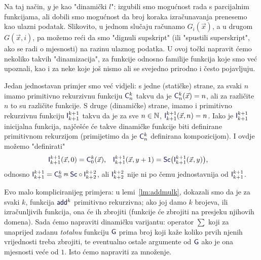 Na taj način, $y$ je kao "dinamički $l$": izgubili smo mogućnost rada s parcijalnim funkcijama, ali dobili smo mogućnost da broj koraka izračunavanja prenesemo kao ulazni podatak. Slikovito, u jednom slučaju računamo $G_i(\vec x)$, a u drugom $G(\vec x,i)$, pa možemo reći da smo "dignuli supskript" (ili "spustili superskript", ako se radi o mjesnosti) na razinu ulaznog podatka. U ovoj točki napravit ćemo nekoliko takvih "dinamizacija", za funkcije odnosno familije funkcija koje smo već upoznali, kao i za neke koje još nismo ali se svejedno prirodno i često pojavljuju.

\begin{primjer}[{name=[koordinantna projekcija kao dinamizacija konstantnih funkcija]}]
Jedan jednostavan primjer smo već vidjeli: s jedne (statičke) strane, za svaki $n$ imamo primitivno rekurzivnu funkciju $\f C_n^k$ takvu da je $\f C_n^k(\vec x)=n$, ali za različite $n$ to su različite funkcije. S druge (dinamičke) strane, imamo i primitivno rekurzivnu funkciju $\f I_{k+1}^{k+1}$ takvu da je za sve $n\in{\mathbb N}$, $\f I_{k+1}^{k+1}(\vec x,n)=n$. Iako je $\f I_{k+1}^{k+1}$ inicijalna funkcija, najčešće će takve dinamičke funkcije biti definirane primitivnom rekurzijom (primijetimo da je $\f C_n^k$ definirana kompozicijom). I ovdje možemo "definirati"
\begin{align}
    \f I_{k+1}^{k+1}(\vec x,0)&=\f C_0^k(\vec x)\text,&
    \f I_{k+1}^{k+1}(\vec x,y+1)&=\f{Sc}\bigl(\f I_{k+1}^{k+1}(\vec x,y)\bigr)\text,
\end{align}
odnosno $\f I_{k+1}^{k+1}=\f C_0^k\pr\f{Sc}\circ\f I_{k+2}^{k+2}$, ali $\f I_{k+2}^{k+2}$ nije ni po čemu jednostavnija od $\f I_{k+1}^{k+1}$.
\end{primjer}



Evo malo kompliciranijeg primjera: u lemi~\ref{lm:addmulk}, dokazali smo da je za svaki $k$, funkcija $\f{add}^k$ primitivno rekurzivna; ako joj damo $k$ brojeva, ili izračunljivih funkcija, ona će ih zbrojiti (funkcije će zbrojiti na presjeku njihovih domena). Sada ćemo napraviti dinamičku varijantu: operator $\sum$ koji za unaprijed zadanu \emph{totalnu} funkciju $\f G$ prima broj koji kaže koliko prvih njenih vrijednosti treba zbrojiti, te eventualno ostale argumente od $\f G$ ako je ona mjesnosti veće od $1$. Isto ćemo napraviti za množenje.

